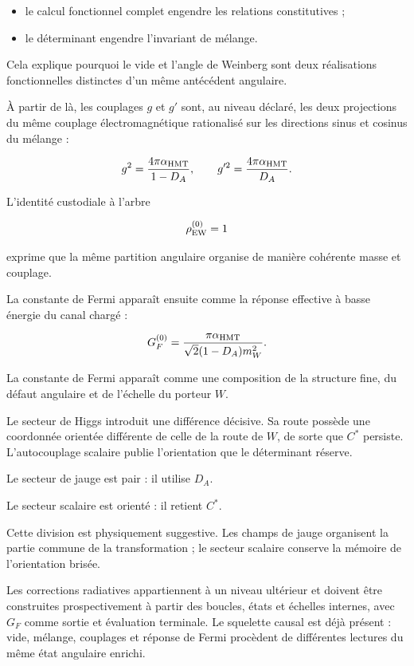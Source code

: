 \begin{itemize}[leftmargin=*,itemsep=0.35em]
\item le calcul fonctionnel complet engendre les relations constitutives ;
\item le déterminant engendre l’invariant de mélange.
\end{itemize}

Cela explique pourquoi le vide et l’angle de Weinberg sont deux réalisations fonctionnelles distinctes d’un même antécédent angulaire.\par

À partir de là, les couplages \(g\) et \(g'\) sont, au niveau déclaré, les deux projections du même couplage électromagnétique rationalisé sur les directions sinus et cosinus du mélange :\par

\[
g^2
=
\frac{4\pi\alpha_{\rm HMT}}{1-D_A},
\qquad
g'^2
=
\frac{4\pi\alpha_{\rm HMT}}{D_A}.
\]

L’identité custodiale à l’arbre\par

\[
\rho_{\rm EW}^{(0)}=1
\]

exprime que la même partition angulaire organise de manière cohérente masse et couplage.\par

La constante de Fermi apparaît ensuite comme la réponse effective à basse énergie du canal chargé :\par

\[
G_F^{(0)}
=
\frac{\pi\alpha_{\rm HMT}}
{\sqrt2(1-D_A)m_W^2}.
\]

La constante de Fermi apparaît comme une composition de la structure fine, du défaut angulaire et de l’échelle du porteur \(W\).\par

Le secteur de Higgs introduit une différence décisive. Sa route possède une coordonnée orientée différente de celle de la route de \(W\), de sorte que \(C^*\) persiste. L’autocouplage scalaire publie l’orientation que le déterminant réserve.\par

Le secteur de jauge est pair : il utilise \(D_A\).\par
Le secteur scalaire est orienté : il retient \(C^*\).\par

Cette division est physiquement suggestive. Les champs de jauge organisent la partie commune de la transformation ; le secteur scalaire conserve la mémoire de l’orientation brisée.\par

Les corrections radiatives appartiennent à un niveau ultérieur et doivent être construites prospectivement à partir des boucles, états et échelles internes, avec \(G_F\) comme sortie et évaluation terminale. Le squelette causal est déjà présent : vide, mélange, couplages et réponse de Fermi procèdent de différentes lectures du même état angulaire enrichi.\par

